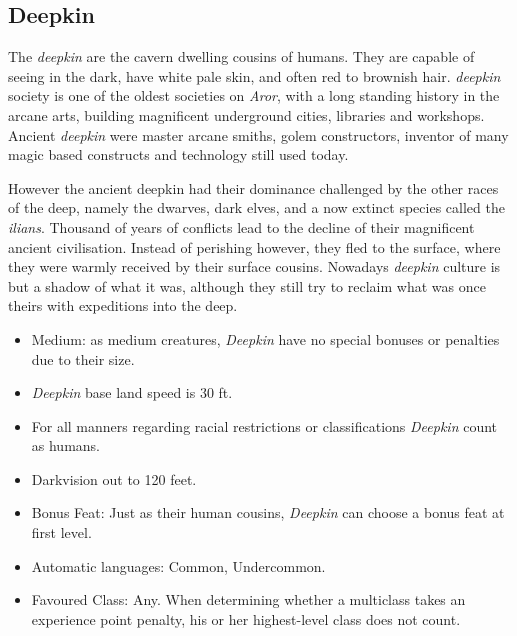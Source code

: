 \subsection*{Deepkin}



The \emph{deepkin} are the cavern dwelling cousins of humans. They are capable
of seeing in the dark, have white pale skin, and often red to brownish hair.
\emph{deepkin} society is one of the oldest societies on \emph{Aror}, with a
long standing history in the arcane arts, building magnificent underground
cities, libraries and workshops. Ancient \emph{deepkin} were master arcane
smiths, golem constructors, inventor of many magic based constructs and
technology still used today.

However the ancient deepkin had their dominance challenged by the other races
of the deep, namely the dwarves, dark elves, and a now extinct species called
the \emph{ilians}. Thousand of years of conflicts lead to the decline of their
magnificent ancient civilisation. Instead of perishing however, they fled to
the surface, where they were warmly received by their surface cousins. Nowadays
\emph{deepkin} culture is but a shadow of what it was, although they still try
to reclaim what was once theirs with expeditions into the deep.

\begin{35e}
  \begin{itemize}[noitemsep]
    \item Medium: as medium creatures, \emph{Deepkin} have no special bonuses or
    penalties due to their size.
    \item \emph{Deepkin} base land speed is 30 ft.
    \item For all manners regarding racial restrictions or classifications
    \emph{Deepkin} count as humans.
    \item Darkvision out to 120 feet.
    \item Bonus Feat: Just as their human cousins, \emph{Deepkin} can choose a
    bonus feat at first level.
    \item Automatic languages: Common, Undercommon.
    \item Favoured Class: Any. When determining whether a multiclass takes an
    experience point penalty, his or her highest-level class does not count.
  \end{itemize}
\end{35e}

